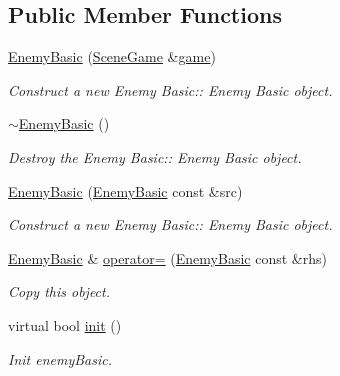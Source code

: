 \subsection*{Public Member Functions}
\begin{DoxyCompactItemize}
\item 
\hyperlink{class_enemy_basic_a1d39809d74f07903c7f6423487598d72}{Enemy\+Basic} (\hyperlink{class_scene_game}{Scene\+Game} \&\hyperlink{class_a_entity_aa2c05db944a8b7487eb8470dd20211ab}{game})
\begin{DoxyCompactList}\small\item\em Construct a new Enemy Basic\+:\+: Enemy Basic object. \end{DoxyCompactList}\item 
\mbox{\label{class_enemy_basic_ac08aed4a3af9defff1d3e0c7aa0139fb}} 
\hyperlink{class_enemy_basic_ac08aed4a3af9defff1d3e0c7aa0139fb}{$\sim$\+Enemy\+Basic} ()
\begin{DoxyCompactList}\small\item\em Destroy the Enemy Basic\+:\+: Enemy Basic object. \end{DoxyCompactList}\item 
\hyperlink{class_enemy_basic_ab0f4b466ccb12febf4053b05fbb52b54}{Enemy\+Basic} (\hyperlink{class_enemy_basic}{Enemy\+Basic} const \&src)
\begin{DoxyCompactList}\small\item\em Construct a new Enemy Basic\+:\+: Enemy Basic object. \end{DoxyCompactList}\item 
\hyperlink{class_enemy_basic}{Enemy\+Basic} \& \hyperlink{class_enemy_basic_ab925c2ecf3e2358c727ba0a0cd751986}{operator=} (\hyperlink{class_enemy_basic}{Enemy\+Basic} const \&rhs)
\begin{DoxyCompactList}\small\item\em Copy this object. \end{DoxyCompactList}\item 
virtual bool \hyperlink{class_enemy_basic_a898943e397eb36c80721951a3457178c}{init} ()
\begin{DoxyCompactList}\small\item\em Init enemy\+Basic. \end{DoxyCompactList}\end{DoxyCompactItemize}
